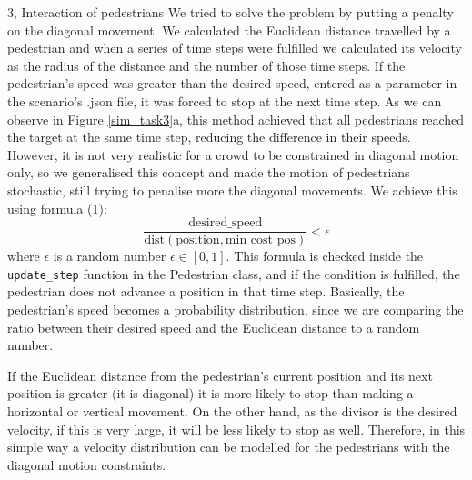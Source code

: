 \documentclass[10pt,a4paper]{article}
\begin{document}
\begin{task}{3, Interaction of pedestrians}
We tried to solve the problem by putting a penalty on the diagonal movement. We calculated the Euclidean distance travelled by a pedestrian and when a series of time steps were fulfilled we calculated its velocity as the radius of the distance and the number of those time steps. If the pedestrian's speed was greater than the desired speed, entered as a parameter in the scenario's .json file, it was forced to stop at the next time step. As we can observe in Figure \ref{sim_task3}a, this method achieved that all pedestrians reached the target at the same time step, reducing the difference in their speeds. However, it is not very realistic for a crowd to be constrained in diagonal motion only, so we generalised this concept and made the motion of pedestrians stochastic, still trying to penalise more the diagonal movements. We achieve this using formula (1):
 \begin{equation}
\frac{\text{desired\_speed}}{\text{dist}(\text{position}, \text{min\_cost\_pos})} < \epsilon
\end{equation}
where \(\epsilon\) is a random number \(\epsilon \in [0,1]\). This formula is checked inside the \texttt{update\_step} function in the Pedestrian class, and if the condition is fulfilled, the pedestrian does not advance a position in that time step. Basically, the pedestrian's speed becomes a probability distribution, since we are comparing the ratio between their desired speed and the Euclidean distance to a random number. 

If the Euclidean distance from the pedestrian's current position and its next position is greater (it is diagonal) it is more likely to stop than making a horizontal or vertical movement. On the other hand, as the divisor is the desired velocity, if this is very large, it will be less likely to stop as well. Therefore, in this simple way a velocity distribution can be modelled for the pedestrians with the diagonal motion constraints.


\end{task}
\end{document}
